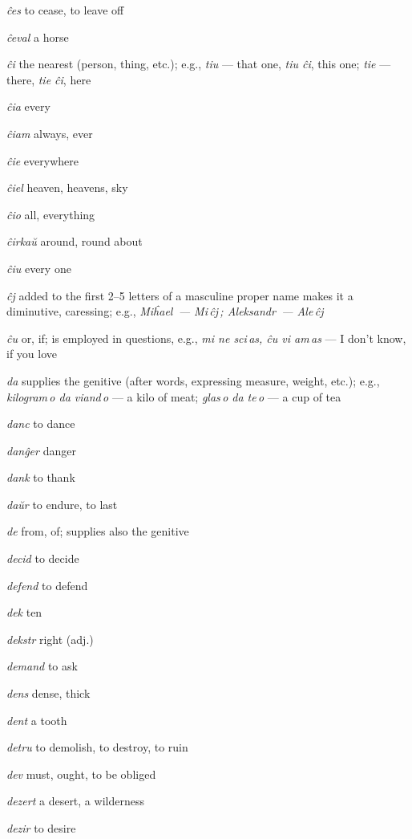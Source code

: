 \begin{landscape}
\begin{multicols}{5}
\begin{outdent}{1em}
\emph{ĉes}  to cease, to leave off

\emph{ĉeval}  a horse

\emph{ĉi}  the nearest (person, thing, etc.); e.g., \emph{tiu} — that one, \emph{tiu ĉi}, this one; \emph{tie} — there, \emph{tie ĉi}, here

\emph{ĉia  }every

\emph{ĉiam}  always, ever

\emph{ĉie}  everywhere

\emph{ĉiel}  heaven, heavens, sky

\emph{ĉio  }all, everything

\emph{ĉirkaŭ}  around, round about

\emph{ĉiu}  every one

\emph{ĉj}  added to the first 2--5 letters of a masculine proper name makes it a diminutive, caressing; e.g., \emph{Miĥael\, — Mi\,ĉj\,; Aleksandr\, — Ale\,ĉj\,}

\emph{ĉu}  or, if; is employed in questions, e.g., \emph{mi ne sci\,as, ĉu vi am\,as} — I don’t know, if you love
\end{outdent}


\begin{outdent}{1em}
\emph{da}  supplies the genitive (after words, expressing measure, weight, etc.); e.g., \emph{kilogram\,o da viand\,o} — a kilo of meat; \emph{glas\,o da te\,o} — a cup of tea

\emph{danc}  to dance

\emph{danĝer}  danger

\emph{dank}  to thank

\emph{daŭr}  to endure, to last

\emph{de}  from, of; supplies also the genitive

\emph{decid}  to decide

\emph{defend}  to defend

\emph{dek}  ten

\emph{dekstr}  right (adj.)

\emph{demand}  to ask

\emph{dens}  dense, thick

\emph{dent}  a tooth

\emph{detru}  to demolish, to destroy, to ruin

\emph{dev}  must, ought, to be obliged

\emph{dezert}  a desert, a wilderness

\emph{dezir}  to desire


\end{outdent}
\end{multicols}
\end{landscape}
